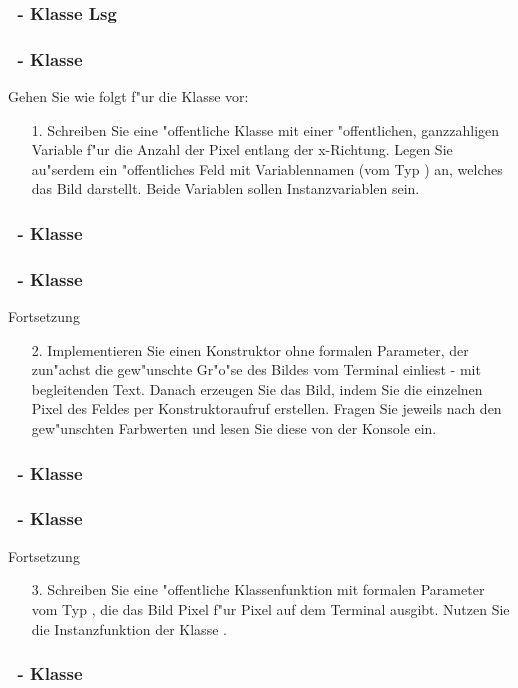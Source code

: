 \begin{frame}%
  \frametitle{\theexercise\ - Klasse  Lsg }%
%
\end{frame}

\begin{frame}%
  \frametitle{\theexercise\ - Klasse }%

Gehen Sie wie folgt f"ur die Klasse  vor:
\begin{enumerate}
\item[1.] Schreiben Sie eine "offentliche Klasse  mit einer "offentlichen, ganzzahligen Variable  f"ur die Anzahl der Pixel entlang der x-Richtung.
  Legen Sie au"serdem ein "offentliches Feld mit Variablennamen  (vom Typ ) an, welches das Bild darstellt.
  Beide Variablen sollen Instanzvariablen sein.
\end{enumerate}
\pause
  \frametitle{\theexercise\ - Klasse  }%
%
\end{frame}



\begin{frame}%
  \frametitle{\theexercise\ - Klasse }%

Fortsetzung
\begin{enumerate}
\item[2.] Implementieren Sie einen Konstruktor ohne formalen Parameter, der zun"achst die gew"unschte Gr"o"se des Bildes vom Terminal einliest - mit begleitenden Text.
  Danach erzeugen Sie das Bild, indem Sie die einzelnen Pixel des Feldes  per Konstruktoraufruf erstellen.
  \mbox{Fragen} Sie jeweils nach den gew"unschten Farbwerten und lesen Sie diese von der Konsole ein.
\end{enumerate}
\pause
  \frametitle{\theexercise\ - Klasse  }%
%
\end{frame}

\begin{frame}%
  \frametitle{\theexercise\ - Klasse }%

Fortsetzung
\begin{enumerate}
\item[3.] Schreiben Sie eine "offentliche Klassenfunktion  mit formalen Parameter vom Typ , die das Bild Pixel f"ur Pixel auf dem Terminal ausgibt.
  Nutzen Sie die Instanzfunktion  der Klasse .
\end{enumerate}
\pause
  \frametitle{\theexercise\ - Klasse  }%
%
\end{frame}


